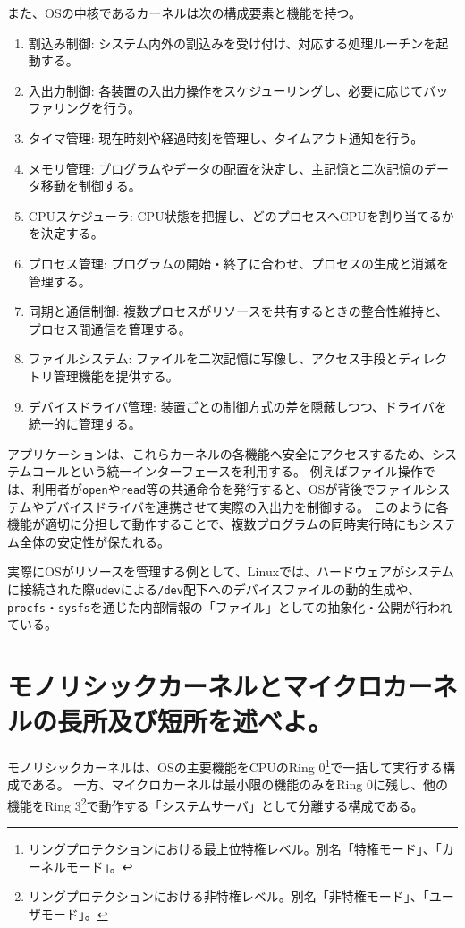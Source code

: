 \documentclass[a4paper,11pt,openany]{ltjsreport}
\begin{document}
また、OSの中核であるカーネルは次の構成要素と機能を持つ。

\begin{enumerate}[label=(\arabic*)]
	\item 割込み制御: システム内外の割込みを受け付け、対応する処理ルーチンを起動する。
	\item 入出力制御: 各装置の入出力操作をスケジューリングし、必要に応じてバッファリングを行う。
	\item タイマ管理: 現在時刻や経過時刻を管理し、タイムアウト通知を行う。
	\item メモリ管理: プログラムやデータの配置を決定し、主記憶と二次記憶のデータ移動を制御する。
	\item CPUスケジューラ: CPU状態を把握し、どのプロセスへCPUを割り当てるかを決定する。
	\item プロセス管理: プログラムの開始・終了に合わせ、プロセスの生成と消滅を管理する。
	\item 同期と通信制御: 複数プロセスがリソースを共有するときの整合性維持と、プロセス間通信を管理する。
	\item ファイルシステム: ファイルを二次記憶に写像し、アクセス手段とディレクトリ管理機能を提供する。
	\item デバイスドライバ管理: 装置ごとの制御方式の差を隠蔽しつつ、ドライバを統一的に管理する。
\end{enumerate}

アプリケーションは、これらカーネルの各機能へ安全にアクセスするため、システムコールという統一インターフェースを利用する\cite{os}。
例えばファイル操作では、利用者が\texttt{open}や\texttt{read}等の共通命令を発行すると、OSが背後でファイルシステムやデバイスドライバを連携させて実際の入出力を制御する\cite{textbook}。
このように各機能が適切に分担して動作することで、複数プログラムの同時実行時にもシステム全体の安定性が保たれる。

実際にOSがリソースを管理する例として、Linuxでは、ハードウェアがシステムに接続された際\texttt{udev}による\texttt{/dev}配下へのデバイスファイルの動的生成や、\texttt{procfs}・\texttt{sysfs}を通じた内部情報の「ファイル」としての抽象化・公開が行われている\cite[pp. 225--226]{linux}。

\section{モノリシックカーネルとマイクロカーネルの長所及び短所を述べよ。}

モノリシックカーネルは、OSの主要機能をCPUのRing 0\footnote{リングプロテクションにおける最上位特権レベル。別名「特権モード」、「カーネルモード」。}で一括して実行する構成である。
一方、マイクロカーネルは最小限の機能のみをRing 0に残し、他の機能をRing 3\footnote{リングプロテクションにおける非特権レベル。別名「非特権モード」、「ユーザモード」。}で動作する「システムサーバ」として分離する構成である。
\end{document}
